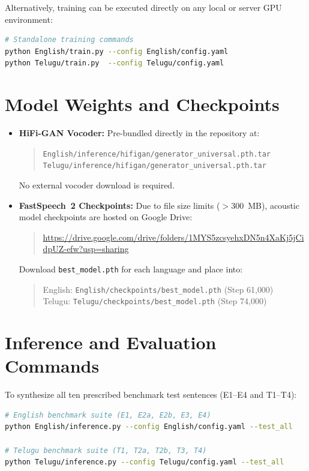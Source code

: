 \documentclass[11pt,a4paper]{report}
\begin{document}
Alternatively, training can be executed directly on any local or server GPU environment:
\begin{lstlisting}[language=bash]
# Standalone training commands
python English/train.py --config English/config.yaml
python Telugu/train.py  --config Telugu/config.yaml
\end{lstlisting}

\section{Model Weights and Checkpoints}
\begin{itemize}
    \item \textbf{HiFi-GAN Vocoder:} Pre-bundled directly in the repository at:
    \begin{quote}
    \texttt{English/inference/hifigan/generator\_universal.pth.tar}\\
    \texttt{Telugu/inference/hifigan/generator\_universal.pth.tar}
    \end{quote}
    No external vocoder download is required.
    \item \textbf{FastSpeech~2 Checkpoints:} Due to file size limits ($>$300~MB), acoustic model checkpoints are hosted on Google Drive:
    \begin{quote}
    \url{https://drive.google.com/drive/folders/1MYS5zcsyehxDN5n4XaKj5jCidpUZ-efw?usp=sharing}
    \end{quote}
    Download \texttt{best\_model.pth} for each language and place into:
    \begin{quote}
    English: \texttt{English/checkpoints/best\_model.pth} (Step 61{,}000)\\
    Telugu: \texttt{Telugu/checkpoints/best\_model.pth} (Step 74{,}000)
    \end{quote}
\end{itemize}

\section{Inference and Evaluation Commands}
To synthesize all ten prescribed benchmark test sentences (E1--E4 and T1--T4):
\begin{lstlisting}[language=bash]
# English benchmark suite (E1, E2a, E2b, E3, E4)
python English/inference.py --config English/config.yaml --test_all

# Telugu benchmark suite (T1, T2a, T2b, T3, T4)
python Telugu/inference.py --config Telugu/config.yaml --test_all
\end{lstlisting}
\end{document}
